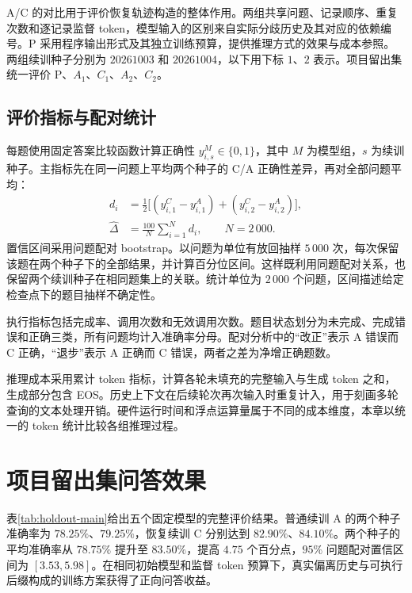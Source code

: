 A/C 的对比用于评价恢复轨迹构造的整体作用。两组共享问题、记录顺序、重复次数和逐记录监督 token，模型输入的区别来自实际分歧历史及其对应的依赖编号。P 采用程序输出形式及其独立训练预算，提供推理方式的效果与成本参照。两组续训种子分别为 $20261003$ 和 $20261004$，以下用下标 $1$、$2$ 表示。项目留出集统一评价 P、$A_1$、$C_1$、$A_2$、$C_2$。

\subsection{评价指标与配对统计}

每题使用固定答案比较函数计算正确性 $y_{i,s}^{M}\in\{0,1\}$，其中 $M$ 为模型组，$s$ 为续训种子。主指标先在同一问题上平均两个种子的 C/A 正确性差异，再对全部问题平均：
\begin{align}
  d_i &= \tfrac12\big[(y_{i,1}^{C}-y_{i,1}^{A})
                    +(y_{i,2}^{C}-y_{i,2}^{A})\big],\\
  \widehat\Delta &= \frac{100}{N}\sum_{i=1}^{N}d_i,
  \qquad N=2\,000.
\end{align}
置信区间采用问题配对 bootstrap。以问题为单位有放回抽样 $5\,000$ 次，每次保留该题在两个种子下的全部结果，并计算百分位区间。这样既利用同题配对关系，也保留两个续训种子在相同题集上的关联。统计单位为 $2\,000$ 个问题，区间描述给定检查点下的题目抽样不确定性。

执行指标包括完成率、调用次数和无效调用次数。题目状态划分为未完成、完成错误和正确三类，所有问题均计入准确率分母。配对分析中的“改正”表示 A 错误而 C 正确，“退步”表示 A 正确而 C 错误，两者之差为净增正确题数。

推理成本采用累计 token 指标，计算各轮未填充的完整输入与生成 token 之和，生成部分包含 EOS。历史上下文在后续轮次再次输入时重复计入，用于刻画多轮查询的文本处理开销。硬件运行时间和浮点运算量属于不同的成本维度，本章以统一的 token 统计比较各组推理过程。

\section{项目留出集问答效果}

\begin{table}[htbp]
  \centering
  \caption{$2\,000$ 题项目留出集问答结果}
  \label{tab:holdout-main}
  \PublicHoldoutTable
\end{table}

表\ref{tab:holdout-main}给出五个固定模型的完整评价结果。普通续训 A 的两个种子准确率为 $78.25\%$、$79.25\%$，恢复续训 C 分别达到 $82.90\%$、$84.10\%$。两个种子的平均准确率从 $78.75\%$ 提升至 $83.50\%$，提高 $4.75$ 个百分点，$95\%$ 问题配对置信区间为 $[3.53,5.98]$。在相同初始模型和监督 token 预算下，真实偏离历史与可执行后缀构成的训练方案获得了正向问答收益。

